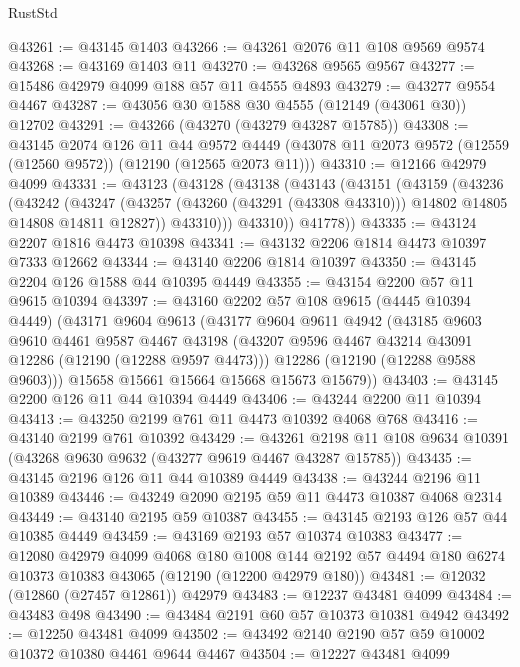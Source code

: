 \begin{lexlean}{RustStd}
\begin{coremodule}
@43261 := @43145 @1403
@43266 := @43261 @2076 @11 @108 @9569 @9574
@43268 := @43169 @1403 @11
@43270 := @43268 @9565 @9567
@43277 := @15486 @42979 @4099 @188 @57 @11 @4555 @4893
@43279 := @43277 @9554 @4467
@43287 := @43056 @30 @1588 @30 @4555 (@12149 (@43061 @30)) @12702
@43291 := @43266 (@43270 (@43279 @43287 @15785))
@43308 := @43145
    @2074
    @126
    @11
    @44
    @9572
    @4449
    (@43078 @11 @2073 @9572 (@12559 (@12560 @9572)) (@12190 (@12565 @2073 @11)))
@43310 := @12166 @42979 @4099
@43331 := @43123
    (@43128
      (@43138
        (@43143
          (@43151
            (@43159
              (@43236
                (@43242
                  (@43247
                    (@43257 (@43260 (@43291 (@43308 @43310))) @14802 @14805 @14808 @14811 @12827))
                  @43310)))
            @43310))
        @41778))
@43335 := @43124 @2207 @1816 @4473 @10398
@43341 := @43132 @2206 @1814 @4473 @10397 @7333 @12662
@43344 := @43140 @2206 @1814 @10397
@43350 := @43145 @2204 @126 @1588 @44 @10395 @4449
@43355 := @43154 @2200 @57 @11 @9615 @10394
@43397 := @43160
    @2202
    @57
    @108
    @9615
    (@4445 @10394 @4449)
    (@43171
      @9604
      @9613
      (@43177
        @9604
        @9611
        @4942
        (@43185
          @9603
          @9610
          @4461
          @9587
          @4467
          @43198
          (@43207 @9596 @4467 @43214 @43091 @12286 (@12190 (@12288 @9597 @4473)))
          @12286
          (@12190 (@12288 @9588 @9603)))
        @15658
        @15661
        @15664
        @15668
        @15673
        @15679))
@43403 := @43145 @2200 @126 @11 @44 @10394 @4449
@43406 := @43244 @2200 @11 @10394
@43413 := @43250 @2199 @761 @11 @4473 @10392 @4068 @768
@43416 := @43140 @2199 @761 @10392
@43429 := @43261 @2198 @11 @108 @9634 @10391 (@43268 @9630 @9632 (@43277 @9619 @4467 @43287 @15785))
@43435 := @43145 @2196 @126 @11 @44 @10389 @4449
@43438 := @43244 @2196 @11 @10389
@43446 := @43249 @2090 @2195 @59 @11 @4473 @10387 @4068 @2314
@43449 := @43140 @2195 @59 @10387
@43455 := @43145 @2193 @126 @57 @44 @10385 @4449
@43459 := @43169 @2193 @57 @10374 @10383
@43477 := @12080
    @42979
    @4099
    @4068
    @180
    @1008
    @144
    @2192
    @57
    @4494
    @180
    @6274
    @10373
    @10383
    @43065
    (@12190 (@12200 @42979 @180))
@43481 := @12032 (@12860 (@27457 @12861)) @42979
@43483 := @12237 @43481 @4099
@43484 := @43483 @498
@43490 := @43484 @2191 @60 @57 @10373 @10381 @4942
@43492 := @12250 @43481 @4099
@43502 := @43492 @2140 @2190 @57 @59 @10002 @10372 @10380 @4461 @9644 @4467
@43504 := @12227 @43481 @4099

\end{coremodule}
\end{lexlean}
